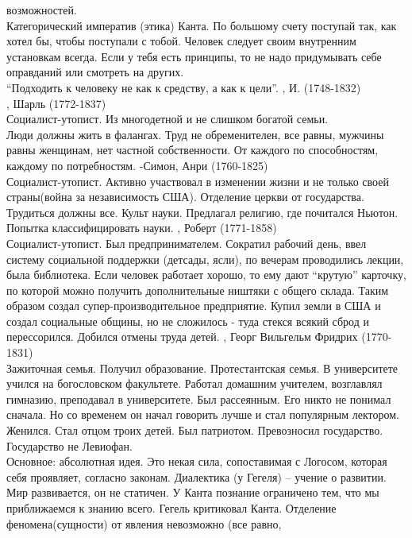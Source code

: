 \documentclass[a4paper,12pt]{report} %
\begin{document}
\begin{itemize}
  возможностей.\\
  Категорический императив (этика) Канта. По большому счету поступай
  так, как хотел бы, чтобы поступали с тобой. Человек следует своим
  внутренним установкам всегда. Если у тебя есть принципы, то не надо
  придумывать себе оправданий или смотреть на других.\\
  ``Подходить к человеку не как к средству, а как к цели''.
, И. (1748-1832)\\
, Шарль (1772-1837)\\
  Социалист-утопист. Из многодетной и не слишком богатой семьи.\\
  Люди должны жить в фалангах. Труд не обременителен, все равны, мужчины
  равны женщинам, нет частной собственности. От каждого по способностям,
  каждому по потребностям.
-Симон, Анри (1760-1825)\\
  Социалист-утопист. Активно участвовал в изменении жизни и не только своей
  страны(война за независимость США). Отделение церкви от
  государства. Трудиться должны все. Культ науки. Предлагал религию, где
  почитался Ньютон. Попытка классифицировать науки.
, Роберт (1771-1858)\\
  Социалист-утопист. Был предпринимателем. Сократил рабочий день, ввел
  систему социальной поддержки (детсады, ясли), по вечерам проводились
  лекции, была библиотека. Если человек работает хорошо, то ему дают
  ``крутую'' карточку, по которой можно получить дополнительные ништяки
  с общего склада. Таким образом создал супер-производительное
  предприятие. Купил земли в США и создал социальные общины, но не
  сложилось - туда стекся всякий сброд и перессорился. Добился отмены
  труда детей.
, Георг Вильгельм Фридрих (1770-1831)\\
  Зажиточная семья. Получил образование. Протестантская семья. В
  университете учился на богословском факультете. Работал домашним
  учителем, возглавлял гимназию, преподавал в университете. Был
  рассеянным. Его никто не понимал сначала. Но со временем он начал
  говорить лучше и стал популярным лектором. Женился. Стал отцом троих
  детей. Был патриотом. Превозносил государство. Государство не Левиофан.\\
  Основное: абсолютная идея. Это некая сила, сопоставимая с Логосом,
  которая себя проявляет, согласно законам. Диалектика (у Гегеля) --
  учение о развитии. Мир развивается, он не статичен. У Канта познание
  ограничено тем, что мы приближаемся к знанию всего. Гегель критиковал
  Канта. Отделение феномена(сущности) от явления невозможно (все равно,

\end{itemize}
\end{document}
